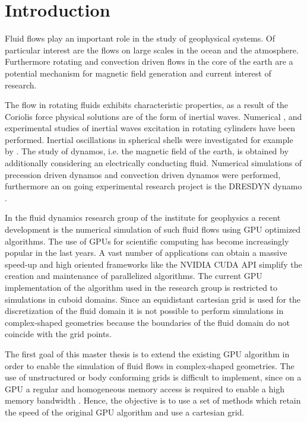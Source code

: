 \chapter*{Introduction}

Fluid flows play an important role in the study of geophysical systems.
Of particular interest are the flows on large scales in the ocean and the atmosphere.
Furthermore rotating and convection driven flows in the core of the earth are a potential mechanism
for magnetic field generation and current interest of research.

The flow in rotating fluids exhibits characteristic properties, as a result of the Coriolis force
physical solutions are of the form of inertial waves.
Numerical \citep{Sauret2012}, \citep{Duguet} and experimental
studies \citep{Fultz1959} of inertial waves excitation in rotating cylinders have been performed.
Inertial oscillations in spherical shells were investigated for example by \citep{Tilgner1999}.
The study of dynamos, i.e. the magnetic field of the earth, is obtained by additionally
considering an electrically conducting fluid.
Numerical simulations of precession driven dynamos \citep{Tilgner2005}
and convection driven dynamos \citep{Tilgner2012} were performed, furthermore
an on going experimental research project is the DRESDYN dynamo \citep{Stefani2015}.

In the fluid dynamics research group of the institute for geophysics
a recent development is the numerical simulation of such fluid flows using GPU optimized algorithms.
The use of GPUs for scientific computing has become increasingly popular in the last years.
A vast number of applications  can obtain a massive speed-up and
high oriented frameworks like the NVIDIA CUDA API simplify the creation
and maintenance of parallelized algorithms.
The current GPU implementation of the algorithm used in the research group is restricted
to simulations in cuboid domains.
Since an equidistant cartesian grid is used for the discretization of the fluid
domain it is not possible to perform simulations in complex-shaped geometries
because the boundaries of the fluid domain  do not coincide with the grid points.

\bigbreak

The first goal of this master thesis is to extend the existing GPU algorithm
in order to enable the simulation of fluid flows in complex-shaped geometries.
The use of unstructured or body conforming grids is difficult to implement,
since on a GPU a regular and homogeneous memory access is required to enable a high memory bandwidth \citep{CUDABP}.
Hence, the objective is to use a set of methods which retain the speed of the original GPU algorithm and use a cartesian grid.

